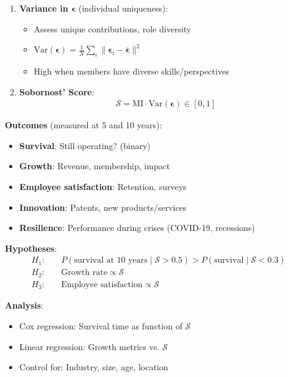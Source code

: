 \documentclass[11pt,a4paper]{article}
\theoremstyle{definition}
\theoremstyle{remark}
\begin{document}
\begin{small}
\begin{enumerate}
\begin{protocol}
\begin{enumerate}
    \item \textbf{Variance in \(\boldsymbol{\epsilon}\)} (individual uniqueness):
        \begin{itemize}
            \item Assess unique contributions, role diversity
            \item \(\text{Var}(\boldsymbol{\epsilon}) = \frac{1}{N}\sum_i \|\boldsymbol{\epsilon}_i - \bar{\boldsymbol{\epsilon}}\|^2\)
            \item High when members have diverse skills/perspectives
        \end{itemize}
    
    \item \textbf{Sobornost' Score}:
        \begin{align}
        \mathcal{S} = \text{MI} \cdot \text{Var}(\boldsymbol{\epsilon}) \in [0, 1]
        \end{align}
\end{enumerate}

\textbf{Outcomes} (measured at 5 and 10 years):
\begin{itemize}
    \item \textbf{Survival}: Still operating? (binary)
    \item \textbf{Growth}: Revenue, membership, impact
    \item \textbf{Employee satisfaction}: Retention, surveys
    \item \textbf{Innovation}: Patents, new products/services
    \item \textbf{Resilience}: Performance during crises (COVID-19, recessions)
\end{itemize}

\textbf{Hypotheses}:
\begin{align}
H_1: \quad &P(\text{survival at 10 years} \mid \mathcal{S} > 0.5) > P(\text{survival} \mid \mathcal{S} < 0.3) \\
H_2: \quad &\text{Growth rate} \propto \mathcal{S} \\
H_3: \quad &\text{Employee satisfaction} \propto \mathcal{S}
\end{align}

\textbf{Analysis}:
\begin{itemize}
    \item Cox regression: Survival time as function of \(\mathcal{S}\)
    \item Linear regression: Growth metrics vs. \(\mathcal{S}\)
    \item Control for: Industry, size, age, location
\end{itemize}


\end{protocol}
\end{enumerate}
\end{small}
\end{document}
